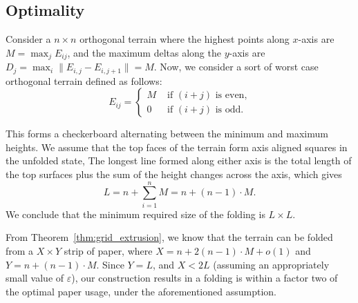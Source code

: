 \subsection{Optimality}
\label{sec:optimality}

Consider a $n\times n$ orthogonal terrain where the highest points along $x$-axis are $M = \max_j E_{ij}$,
and the maximum deltas along the $y$-axis are $D_j = \max_i{\|E_{i,j}-E_{i,j+1}\|} = M$.
Now, we consider a sort of worst case orthogonal terrain defined as follows:
$$
E_{ij}=
\begin{cases}
M & \textrm{ if $(i+j)$ is even,}\\
0 & \textrm{ if $(i+j)$ is odd.}
\end{cases}
$$

This forms a checkerboard alternating between the minimum and maximum heights.
We assume that the top faces of the terrain form axis aligned squares in the unfolded state,
The longest line formed along either axis is the total length of the top surfaces plus the sum of the height changes across the axis, which gives
$$L = n + \sum^{n}_{i=1} M = n + (n-1)\cdot M.$$
We conclude that the minimum required size of the folding is $L\times L$.

From Theorem~\ref{thm:grid_extrusion}, we know that the terrain can be folded from a $X\times Y$ strip of paper,
where $X = n + 2(n-1)\cdot M + o(1)$ and $Y = n + (n-1)\cdot M$.
Since $Y = L$, and $X < 2L$ (assuming an appropriately small value of $\varepsilon$),
our construction results in a folding is within a factor two of the optimal paper usage, under the aforementioned assumption.




